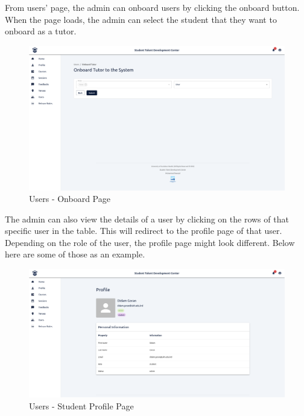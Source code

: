 \begin{justify}
    \vspace{0.25cm}
    \newendline From users' page, the admin can onboard users by clicking the onboard button. When the page loads, the admin can select the student that they want to onboard as a tutor.

    \begin{figure}[H]
        \centerline{\includegraphics[width=150mm,scale=1]{figures/implementation_and_testing/implementation/frontend/pages/Users - Onboard.png}}
        \caption{Users - Onboard Page}
    \end{figure}

    \vspace{0.25cm}
    \newendline The admin can also view the details of a user by clicking on the rows of that specific user in the table. This will redirect to the profile page of that user. Depending on the role of the user, the profile page might look different. Below here are some of those as an example.

    \begin{figure}[H]
        \centerline{\includegraphics[width=150mm,scale=1]{figures/implementation_and_testing/implementation/frontend/pages/Users - Student Profile.png}}
        \caption{Users - Student Profile Page}
    \end{figure}


\end{justify}
